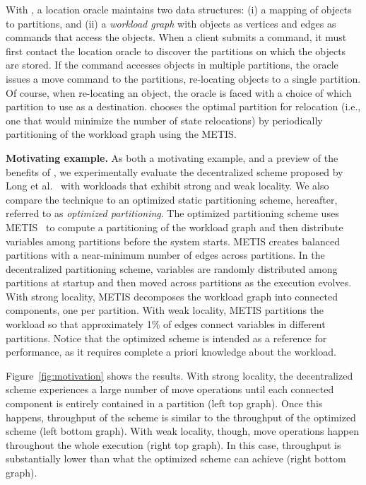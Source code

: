With \dynastar, a location oracle maintains two data structures: (i) a
mapping of objects to partitions, and (ii) a \emph{workload graph}
with objects as vertices and edges as commands that access the
objects.  When a client submits a command, it must first contact the
location oracle to discover the partitions on which the objects are
stored.  If the command accesses objects in multiple partitions, the
oracle issues a move command to the partitions, re-locating objects to
a single partition. Of course, when re-locating an object, the oracle
is faced with a choice of which partition to use as a destination.
\dynastar chooses the optimal partition for relocation (i.e., one that
would minimize the number of state relocations) by periodically
partitioning of the workload graph using the METIS.



\noindent
\textbf{Motivating example.}
As both a motivating example, and a preview of the benefits of
\dynastar, we experimentally evaluate the decentralized scheme
proposed by Long et al.~\cite{hoang2016} with workloads that exhibit
strong and weak locality.  We also compare the technique to an
optimized static partitioning scheme, hereafter, referred to as
\emph{optimized partitioning}.  The optimized partitioning scheme uses
METIS~\cite{Abou-Rjeili:2006} to compute a partitioning of the
workload graph and then distribute variables among partitions before the
system starts.  METIS creates balanced partitions with a near-minimum
number of edges across partitions.  In the decentralized partitioning
scheme, variables are randomly distributed among partitions at startup
and then moved across partitions as the execution evolves.  With
strong locality, METIS decomposes the workload graph into connected
components, one per partition.  With weak locality, METIS partitions
the workload so that approximately 1\% of edges connect variables in
different partitions.  Notice that the optimized scheme is intended as
a reference for performance, as it requires complete a priori
knowledge about the workload.

Figure~\ref{fig:motivation} shows the results.  With strong locality,
the decentralized scheme experiences a large number of move operations
until each connected component is entirely contained in a partition
(left top graph).  Once this happens, throughput of the scheme is
similar to the throughput of the optimized scheme (left bottom graph).
With weak locality, though, move operations happen throughout the
whole execution (right top graph).  In this case, throughput is
substantially lower than what the optimized scheme can achieve (right
bottom graph).



